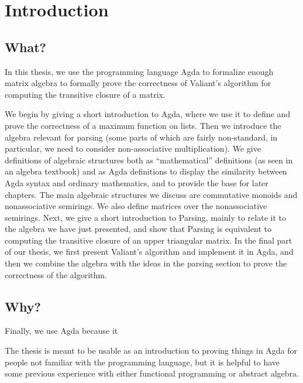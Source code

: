 \section{Introduction}

\subsection{What?}
In this thesis, we use the programming language Agda to formalize enough matrix algebra to formally prove the correctness of Valiant's algorithm for computing the transitive closure of a matrix.

We begin by giving a short introduction to Agda, where we use it to define and prove the correctness of a maximum function on lists. Then we introduce the algebra relevant for parsing (some parts of which are fairly non-standard, in particular, we need to consider non-associative multiplication). We give definitions of algebraic structures both as ``mathematical'' definitions (as seen in an algebra textbook) and as Agda definitions to display the similarity between Agda syntax and ordinary mathematics, and to provide the base for later chapters. The main algebraic structures we discuss are commutative monoids and nonassociative semirings. We also define matrices over the nonassociative semirings. Next, we give a short introduction to Parsing, mainly to relate it to the algebra we have just presented, and show that Parsing is equivalent to computing the transitive closure of an upper triangular matrix. In the final part of our thesis, we first present Valiant's algorithm and implement it in Agda, and then we combine the algebra with the ideas in the parsing section to prove the correctness of the algorithm.

\subsection{Why?}
Finally, we use Agda because it 


The thesis is meant to be usable as an introduction to proving things in Agda for people not familiar with the programming language, but it is helpful to have some previous experience with either functional programming or abstract algebra.
